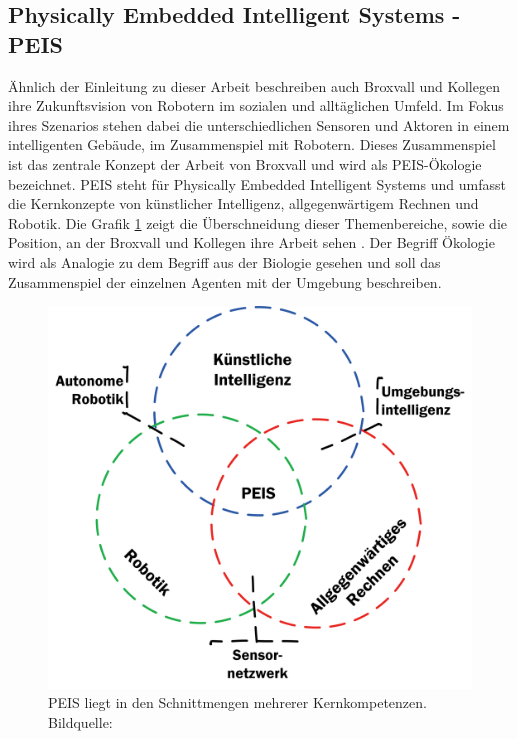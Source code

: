 \subsection{Physically Embedded Intelligent Systems - PEIS}
\label{sec:relatedwork-peis}

Ähnlich der Einleitung zu dieser Arbeit beschreiben auch Broxvall und Kollegen ihre Zukunftsvision von Robotern im sozialen und alltäglichen Umfeld. Im Fokus ihres Szenarios stehen dabei die unterschiedlichen Sensoren und Aktoren in einem intelligenten Gebäude, im Zusammenspiel mit Robotern. Dieses Zusammenspiel ist das zentrale Konzept der Arbeit von Broxvall und wird als PEIS-Ökologie bezeichnet. PEIS steht für Physically Embedded Intelligent Systems und umfasst die Kernkonzepte von künstlicher Intelligenz, allgegenwärtigem Rechnen und Robotik. Die Grafik \ref{fig:sota-peis} zeigt die Überschneidung dieser Themenbereiche, sowie die Position, an der Broxvall und Kollegen ihre Arbeit sehen \citep{Saffiotti:2005:PEA:1107548.1107615}. Der Begriff Ökologie wird als Analogie zu dem Begriff aus der Biologie gesehen und soll das Zusammenspiel der einzelnen Agenten mit der Umgebung beschreiben.


\begin{figure}[H]
	\centering
	\includegraphics[scale=0.6]{fig/peis}   
	\caption[Kompetenzen PEIS]{PEIS liegt in den Schnittmengen mehrerer Kernkompetenzen. Bildquelle: \cite{Saffiotti:2005:PEA:1107548.1107615}}
	\label{fig:sota-peis}
\end{figure}


